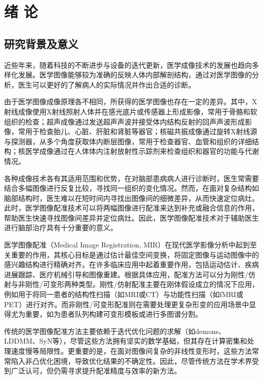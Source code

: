 \chapter{绪 论}

\section{研究背景及意义}

近些年来，随着科技的不断进步与设备的迭代更新，医学成像技术的发展也趋向多样化发展。医学图像能够较为准确的反映人体内部解剖结构，通过对医学图像的分析，医生可以更好的了解病人的实际情况并作出合适的诊断。

由于医学图像成像原理各不相同，所获得的医学图像也存在一定的差异。其中，X射线成像使用X射线照射人体并在感光底片或传感器上形成影像，常用于骨骼和软组织的检查；超声成像通过发送超声声波并接受体内结构反射的回声声波形成影像，常用于检查胎儿、心脏、肝脏和肾脏等器官；核磁共振成像通过旋转X射线源与探测器，从多个角度获取体内断层图像，常用于检查器官、血管和组织的详细结构；核医学成像通过在人体体内注射放射性示踪剂来检查组织和器官的功能与代谢情况。

各种成像技术各有其适用范围和优势，在对脑部患病病人进行诊断时，医生常需要结合多幅图像进行反复比较，寻找同一组织的变化情况。然而，在面对复杂结构如脑部结构时，医生难以在短时间内寻找出图像间的细微差异，从而快速定位病灶。此时，医学图像配准技术可以将两幅图像进行配准来达到补充或融合信息的作用，帮助医生快速寻找图像间差异并定位病灶。因此，医学图像配准技术对于辅助医生进行脑部治疗具有十分重要的意义。

医学图像配准（Medical Image Registration, MIR）在现代医学影像分析中起到至关重要的作用，其核心目标是通过估计最佳空间变换，将固定图像与运动图像中的感兴趣结构进行精确对齐。在许多临床应用中起着重要作用，包括运动估计、疾病进展跟踪、医疗机械引导和图像重建\cite{fuDeepLearningMedical2019}。根据具体应用，配准方法可以分为刚性/仿射与非刚性/可变形两种类型。刚性/仿射配准主要在刚体假设成立的情况下应用，例如用于将同一患者的结构性扫描（如MRI或CT）与功能性扫描（如fMRI或PET）进行对齐。而非刚性/可变形配准则在需要处理更复杂形变的应用场景中显得尤为重要，如为患者队列构建可变形模板\cite{ganser2004deformable}或进行多图谱分割\cite{cabezas2011review}。

传统的医学图像配准方法主要依赖于迭代优化问题的求解（如demons\cite{vercauteren2009diffeomorphic}、LDDMM\cite{beg2005computing}、SyN\cite{avants2008symmetric}等），尽管这些方法拥有坚实的数学基础，但其存在计算密集和处理速度慢等局限性。更重要的是，在面对图像间复杂的非线性变形时，这些方法常常陷入非凸优化困境，导致优化结果的不确定性。因此，尽管传统方法在学术界受到广泛认可，但仍需寻求提升配准精度与效率的新方法。


